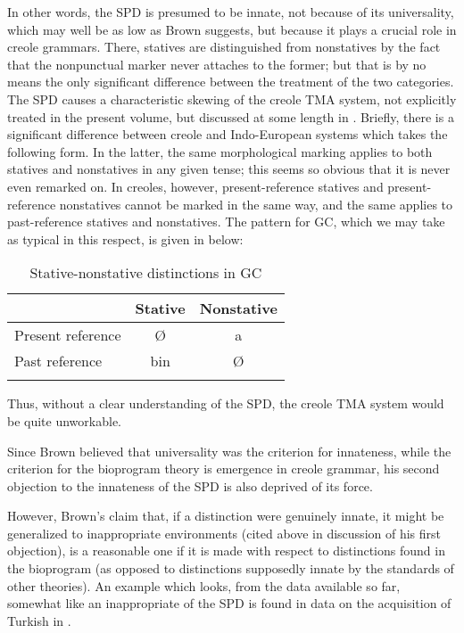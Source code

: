 In other words, the SPD is presumed to be innate, not because of its universality, which may well be as low as Brown suggests, but because it plays a crucial role in creole grammars. There, statives are distinguished from nonstatives by the fact that the nonpunctual marker never attaches to the former; but that is by no means the only signifi\-cant difference between the treatment of the two categories. The SPD causes a characteristic skewing of the creole TMA system, not explicitly treated in the present volume, but discussed at some length in \citet[Chapter 2]{Bickerton1975}. Briefly, there is a significant difference between creole and Indo-European systems which takes the following form. In the latter, the same morphological marking applies to both statives and nonstatives in any given tense; this seems so obvious that it is never even remarked on. In creoles, however, present-reference statives and present-reference nonstatives cannot be marked in the same way, and the same applies to past-reference statives and nonstatives. The pattern for GC, which we may take as typical in this respect, is given in  below:

\begin{table}
	\begin{tabular}{lcc}
	\lsptoprule
	& Stative & Nonstative \\
	\midrule
	Present reference & \O & a\\
	Past reference & bin & \O\\
	\lspbottomrule
	\end{tabular}
	\caption{Stative-nonstative distinctions in GC}\label{tab:3.1}
\end{table}
Thus, without a clear understanding of the SPD, the creole TMA system would be quite unworkable.

Since Brown believed that universality was the criterion for innateness, while the criterion for the bioprogram theory is emergence
in creole grammar, his second objection to the innateness of the SPD is also deprived of its force.

However, Brown's claim that, if a distinction were genuinely innate, it might be generalized to inappropriate environments (cited above in discussion of his first objection), is a reasonable one if it is made with respect to distinctions found in the bioprogram (as opposed to distinctions supposedly innate by the standards of other theories). An example which looks, from the data available so far, somewhat like an inappropriate  of the SPD is found in data on the
acquisition of Turkish in \citet{SlobinEtAl1980}.

